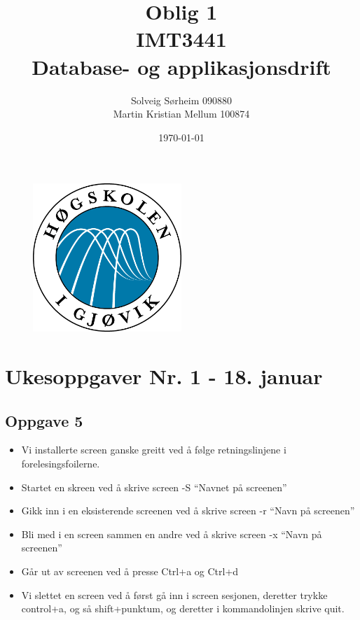 \documentclass[a4paper, norsk, 12pt]{article}
\title{Oblig 1 \\ IMT3441 \\ Database- og applikasjonsdrift}
\author{Solveig Sørheim 090880 \\ Martin Kristian Mellum 100874}
\date{\today}
\begin{document}
\begin{figure}[h!]
 \centering
  \includegraphics[width=0.5\textwidth]{Images/hig_logo.png}
 \maketitle       %
\end{figure}
\pagebreak
\tableofcontents %
\pagebreak	%

\section{Ukesoppgaver Nr. 1 - 18. januar}
\subsection{Oppgave 5}
\begin{itemize}
\item Vi installerte screen ganske greitt ved å følge retningslinjene i forelesingsfoilerne.
\item Startet en skreen ved å skrive screen -S “Navnet på screenen”
\item Gikk inn i en eksisterende screenen ved å skrive screen -r “Navn på screenen”
\item Bli med i en screen sammen en andre ved å skrive screen -x “Navn på screenen”
\item Går ut av screenen ved å presse Ctrl+a og Ctrl+d
\item Vi slettet en screen ved å først gå inn i screen sesjonen, deretter trykke control+a, og så shift+punktum, og deretter i kommandolinjen skrive quit.
\end{itemize}
\end{document}
